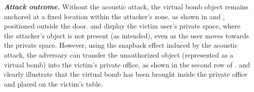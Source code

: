 \noindent \emph{\textbf{Attack outcome.}} Without the acoustic attack, the virtual bomb object remains anchored at a fixed location within the attacker’s zone, as shown in  and , positioned outside the door.  and  display the victim user's private space, where the attacker’s object is not present (as intended), even as the user moves towards the private space.
However, using the snapback effect induced by the acoustic attack, the adversary can transfer the unauthorized object (represented as a virtual bomb) into the victim’s private office, as shown in the second row of .  and  clearly illustrate that the virtual bomb has been brought inside the private office and placed on the victim’s table.































